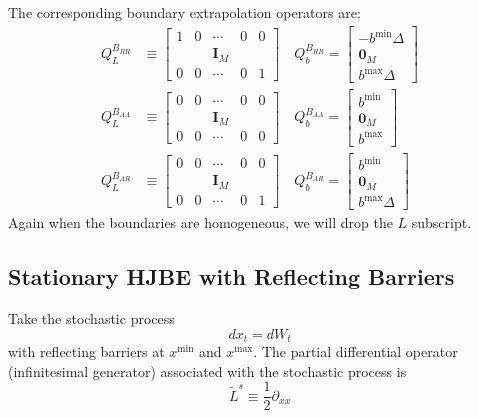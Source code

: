 \documentclass[11pt]{article}
\newcommand{\D}[1][]{\ensuremath{\partial_{#1}}}
\begin{document}
The corresponding boundary extrapolation operators are:
\begin{align}
	Q^{B_{RR}}_L &\equiv \begin{bmatrix}1&0&\cdots&0&0\\&&\mathbf{I}_M&&\\0&0&\cdots&0&1\end{bmatrix}\quad
	Q^{B_{RR}}_b = \begin{bmatrix}-b^{\min}\Delta\\\mathbf{0}_M\\b^{\max}\Delta\end{bmatrix}\label{eq:Q-RR}\\
	Q^{B_{AA}}_L &\equiv \begin{bmatrix}0&0&\cdots&0&0\\&&\mathbf{I}_M&&\\0&0&\cdots&0&0\end{bmatrix}\quad
	Q^{B_{AA}}_b = \begin{bmatrix}b^{\min}\\\mathbf{0}_M\\b^{\max}\end{bmatrix}\label{eq:Q-AA}\\
	Q^{B_{AR}}_L &\equiv \begin{bmatrix}0&0&\cdots&0&0\\&&\mathbf{I}_M&&\\0&0&\cdots&0&1\end{bmatrix}\quad
	Q^{B_{AR}}_b = \begin{bmatrix}b^{\min}\\\mathbf{0}_M\\b^{\max}\Delta\end{bmatrix}\label{eq:Q-AR}
\end{align}
Again when the boundaries are homogeneous, we will drop the $L$ subscript.

\subsection{Stationary HJBE with Reflecting Barriers}\label{sec:simple-reflecting-example}
Take the stochastic process
$$
d x_t = d W_t
$$
with reflecting barriers at $x^{\min}$ and $x^{\max}$.  The partial differential operator (infinitesimal generator) associated with the stochastic process is
\begin{equation}
	\tilde{L}^s \equiv \frac{1}{2}\D[xx]\label{eq:L-s-nodrift}
\end{equation}
\end{document}
